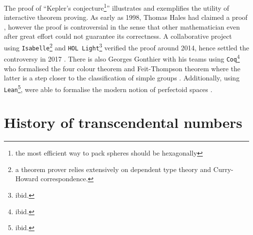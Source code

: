 \documentclass{report}
\theoremstyle{definition}
\begin{document}
The proof of ``Kepler's conjecture\footnote{the most efficient way to pack spheres should be hexagonally}'' illustrates and exemplifies the utility of interactive theorem proving. As early as 1998, Thomas Hales had claimed a proof \cite{hales1998kepler,harrison2014history}, however the proof is controversial in the sense that other mathematician even after great effort could not guarantee its correctness. A collaborative project using {\tt \small Isabelle}\footnote{a theorem prover relies extensively on dependent type theory and Curry-Howard correspondence.} and {\tt \small HOL Light}\footnote{ibid.} verified the proof around 2014, hence settled the controversy in 2017 \cite{hales2017formal}. There is also Georges Gonthier with his teams using {\tt \small Coq}\footnote{ibid.} who formalised the four colour theorem and Feit-Thompson theorem where the latter is a step closer to the classification of simple groups \cite{gonthier2008formal, gonthier2013machine}. Additionally, using {\tt \small Lean}\footnote{ibid.},  were able to formalise the modern notion of perfectoid spaces \cite{buzzard2020formalising}.

\section{History of transcendental numbers}
\end{document}
